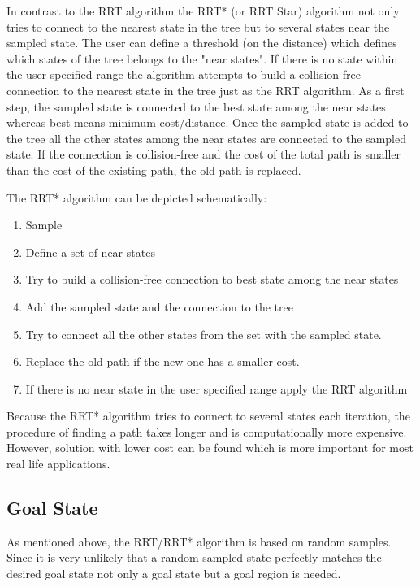 In contrast to the RRT algorithm the RRT* (or RRT Star) algorithm not only tries to connect to the nearest state in the tree but to several states near the sampled state. The user can define a threshold (on the distance) which defines which states of the tree belongs to the "near states". If there is no state within the user specified range the algorithm attempts to build a collision-free connection to the nearest state in the tree just as the RRT algorithm.  \newline
As a first step, the sampled state is connected to the best state among the near states whereas best means minimum cost/distance. Once the sampled state is added to the tree all the other states among the near states are connected to the sampled state. If the connection is collision-free and the cost of the total path is smaller than the cost of the existing path, the old path is replaced. \newline

The RRT* algorithm can be depicted schematically:


\begin{enumerate}
  \item Sample
  \item Define a set of near states
  \item Try to build a collision-free connection to best state among the near states
  \item Add the sampled state and the connection to the tree 
  \item Try to connect all the other states from the set with the sampled state. 
  \item Replace the old path if the new one has a smaller cost.
  \item If there is no near state in the user specified range apply the RRT algorithm
\end{enumerate}


Because the RRT* algorithm tries to connect to several states each iteration, the procedure of finding a path takes longer and is computationally more expensive. However, solution with lower cost can be found which is more important for most real life applications.

\subsection{Goal State}

As mentioned above, the RRT/RRT* algorithm is based on random samples. Since it is very unlikely that a random sampled state perfectly matches the desired goal state not only a goal state but a goal region is needed. 


